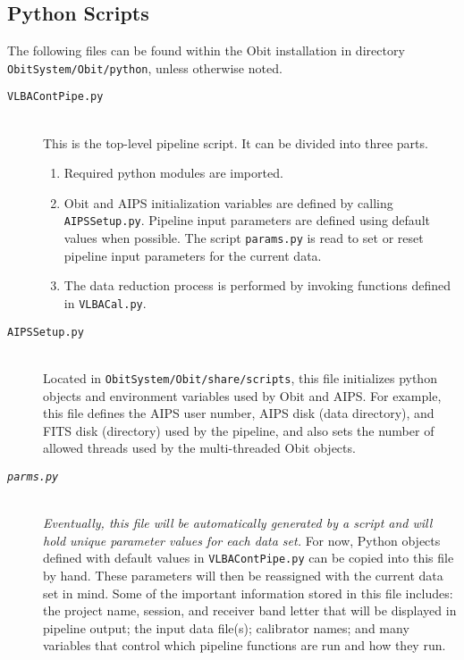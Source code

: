 \documentclass[10pt,onecolumn,final]{IEEEtran}
\begin{document}
\subsection{Python Scripts}

The following files can be found within the Obit installation in directory {\tt ObitSystem/Obit/python}, unless otherwise noted.

\begin{description}
\item[\tt VLBAContPipe.py] \hfill \\ This is the top-level pipeline script. It can be divided into three parts.
	\begin{enumerate}
		\item Required python modules are imported.  
		\item Obit and AIPS initialization variables are defined by calling {\tt AIPSSetup.py}.  Pipeline input parameters are defined using default values when possible.  The script {\tt params.py} is read to set or reset pipeline input parameters for the current data.  
		\item The data reduction process is performed by invoking functions defined in {\tt VLBACal.py}.
	\end{enumerate}

\item[\tt AIPSSetup.py] \hfill \\ Located in \verb|ObitSystem/Obit/share/scripts|, this file initializes python objects and environment variables used by Obit and AIPS.  For example, this file defines the AIPS user number, AIPS disk (data directory), and FITS disk (directory) used by the pipeline, and also sets the number of allowed threads used by the multi-threaded Obit objects.

\item[\tt \emph{parms.py}] \hfill \\ \emph{Eventually, this file will be automatically generated by a script and will hold unique parameter values for each data set.}  For now, Python objects defined with default values in {\tt VLBAContPipe.py} can be copied into this file by hand.  These parameters will then be reassigned with the current data set in mind.  Some of the important information stored in this file includes: the project name, session, and receiver band letter that will be displayed in pipeline output; the input data file(s); calibrator names; and many variables that control which pipeline functions are run and how they run.


\end{description}
\end{document}
